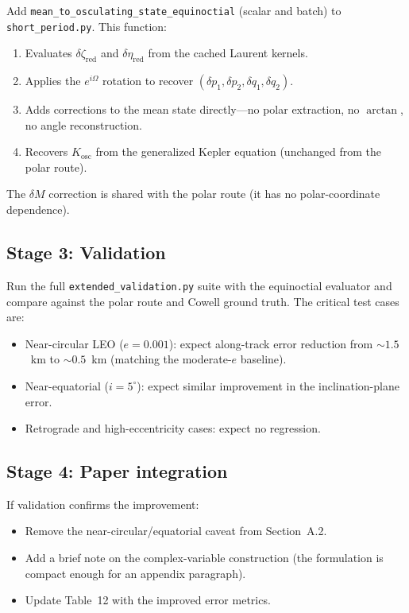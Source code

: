 \documentclass[11pt]{article}
\begin{document}
Add \texttt{mean\_to\_osculating\_state\_equinoctial} (scalar and batch) to
\texttt{short\_period.py}. This function:
\begin{enumerate}
\item Evaluates $\delta\zeta_{\mathrm{red}}$ and $\delta\eta_{\mathrm{red}}$
      from the cached Laurent kernels.
\item Applies the $e^{i\Omega}$ rotation to recover
      $(\delta p_1, \delta p_2, \delta q_1, \delta q_2)$.
\item Adds corrections to the mean state directly---no polar extraction,
      no $\arctan$, no angle reconstruction.
\item Recovers $K_{\mathrm{osc}}$ from the generalized Kepler equation
      (unchanged from the polar route).
\end{enumerate}
The $\delta M$ correction is shared with the polar route (it has no
polar-coordinate dependence).

\subsection*{Stage 3: Validation}

Run the full \texttt{extended\_validation.py} suite with the equinoctial
evaluator and compare against the polar route and Cowell ground truth.
The critical test cases are:
\begin{itemize}
\item Near-circular LEO ($e = 0.001$): expect along-track error reduction
      from $\sim\!1.5$~km to $\sim\!0.5$~km (matching the moderate-$e$ baseline).
\item Near-equatorial ($i = 5^\circ$): expect similar improvement in the
      inclination-plane error.
\item Retrograde and high-eccentricity cases: expect no regression.
\end{itemize}

\subsection*{Stage 4: Paper integration}

If validation confirms the improvement:
\begin{itemize}
\item Remove the near-circular/equatorial caveat from Section~A.2.
\item Add a brief note on the complex-variable construction (the formulation
      is compact enough for an appendix paragraph).
\item Update Table~12 with the improved error metrics.
\end{itemize}
\end{document}
